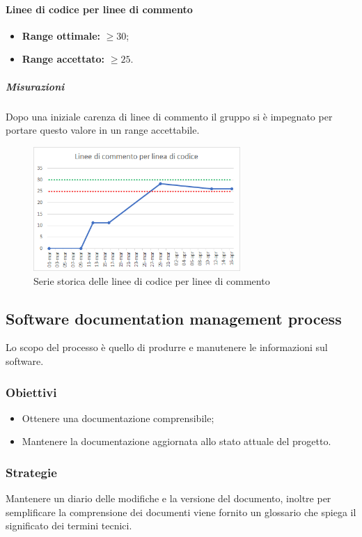 			\paragraph{Linee di codice per linee di commento} \Spazio
			\begin{itemize}
				\item \textbf{Range ottimale:} $\geq30$;
				\item \textbf{Range accettato:} $\geq25$.
			\end{itemize}
		    \subparagraph{Misurazioni}
		     Dopo una iniziale carenza di linee di commento il gruppo si è impegnato per portare questo valore in un range accettabile.
		    \begin{figure}[H]
		   	\centering 
		    	\includegraphics[width=0.7\textwidth]{Images/comm.png}
		    	\caption{Serie storica delle linee di codice per linee di commento}
		    	\label{comm} 
		    \end{figure}

	\subsection{Software documentation management process}
	\label{sub:qdp3}
	
	Lo scopo del processo è quello di produrre e manutenere le informazioni sul software.
		\subsubsection{Obiettivi}
		\begin{itemize}
			\item Ottenere una documentazione comprensibile;
			\item Mantenere la documentazione aggiornata allo stato attuale del progetto.
		\end{itemize}
		\subsubsection{Strategie}
		Mantenere un diario delle modifiche e la versione del documento, inoltre per semplificare la comprensione dei documenti viene fornito un glossario che spiega il significato dei termini tecnici. 
